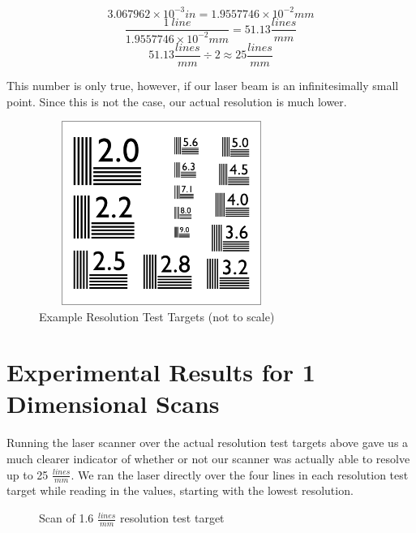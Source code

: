 \documentclass[letterpaper, 12pt]{article}
\begin{document}
$$ 3.067962\times10^{-3}in = 1.9557746\times10^{-2}mm $$
$$ \frac{1\ line}{1.9557746\times10^{-2}mm} = 51.13\frac{lines}{mm} $$
$$ 51.13\frac{lines}{mm} \div 2 \approx 25\frac{lines}{mm} $$

\par
This number is only true, however, if our laser beam is an infinitesimally small point. Since this is not the case, our actual resolution is much lower.

\begin{figure}[H]
  \centering
  \includegraphics[width=8cm,height=6cm]{resolution_test}
  \caption[caption]{Example Resolution Test Targets (not to scale)\cite{test_chart}}
\end{figure}

\section{Experimental Results for 1 Dimensional Scans}
\par
Running the laser scanner over the actual resolution test targets above gave us a much clearer indicator of whether or not our scanner was actually able to resolve up to 25 $\frac{lines}{mm}$. We ran the laser directly over the four lines in each resolution test target while reading in the values, starting with the lowest resolution.

  \dataone
\begin{figure}[H]
  \centering
  \caption[caption]{Scan of 1.6 $\frac{lines}{mm}$ resolution test target}
\end{figure}
\end{document}
